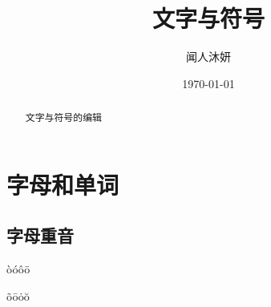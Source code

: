 \documentclass[UTF8]{ctexart}
\title{文字与符号}
\author{闻人沐妍}
\date{\today}
\begin{document}
    \maketitle

    \begin{abstract}
        文字与符号的编辑
    \end{abstract}

    \tableofcontents

    \section{字母和单词}
        \subsection{字母重音}
            \`o\phantom{50}\'o\phantom{50}\^o\phantom{50}\"o
            
            \~o\phantom{50}\=o\phantom{50}\.o\phantom{50}\u{o}
\end{document}
